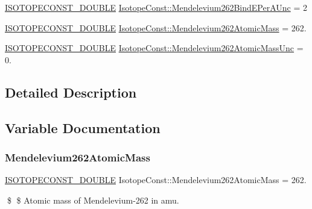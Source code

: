 \begin{DoxyCompactItemize}
\item 
\mbox{\hyperlink{group___isotope_const-_macros_ga8f45a7272ce02c0b4c65c44636ed719a}{I\+S\+O\+T\+O\+P\+E\+C\+O\+N\+S\+T\+\_\+\+D\+O\+U\+B\+LE}} \mbox{\hyperlink{group___isotope_const-_mendelevium-_md262_ga7e0396f87ef08311f7b362aa03a0de8d}{Isotope\+Const\+::\+Mendelevium262\+Bind\+E\+Per\+A\+Unc}} = 2
\item 
\mbox{\hyperlink{group___isotope_const-_macros_ga8f45a7272ce02c0b4c65c44636ed719a}{I\+S\+O\+T\+O\+P\+E\+C\+O\+N\+S\+T\+\_\+\+D\+O\+U\+B\+LE}} \mbox{\hyperlink{group___isotope_const-_mendelevium-_md262_ga3e6fc1c8185fa88baa1e85fab350bd4f}{Isotope\+Const\+::\+Mendelevium262\+Atomic\+Mass}} = 262.
\item 
\mbox{\hyperlink{group___isotope_const-_macros_ga8f45a7272ce02c0b4c65c44636ed719a}{I\+S\+O\+T\+O\+P\+E\+C\+O\+N\+S\+T\+\_\+\+D\+O\+U\+B\+LE}} \mbox{\hyperlink{group___isotope_const-_mendelevium-_md262_gadae79f102ff69c58189465a11d42d56d}{Isotope\+Const\+::\+Mendelevium262\+Atomic\+Mass\+Unc}} = 0.
\end{DoxyCompactItemize}


\subsection{Detailed Description}


\subsection{Variable Documentation}
\mbox{\label{group___isotope_const-_mendelevium-_md262_ga3e6fc1c8185fa88baa1e85fab350bd4f}} 
\subsubsection{\texorpdfstring{Mendelevium262\+Atomic\+Mass}{Mendelevium262AtomicMass}}
{\footnotesize\ttfamily \mbox{\hyperlink{group___isotope_const-_macros_ga8f45a7272ce02c0b4c65c44636ed719a}{I\+S\+O\+T\+O\+P\+E\+C\+O\+N\+S\+T\+\_\+\+D\+O\+U\+B\+LE}} Isotope\+Const\+::\+Mendelevium262\+Atomic\+Mass = 262.}

\$ \$ Atomic mass of Mendelevium-\/262 in amu. \mbox{\label{group___isotope_const-_mendelevium-_md262_gadae79f102ff69c58189465a11d42d56d}} 
